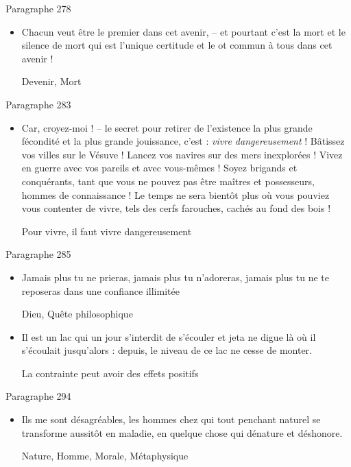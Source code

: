 \documentclass[french,a4paper,11pt,answers]{exam}
\newcommand{\cit}[2]{\og #1 \fg{} \begin{solution}{ #2 }\end{solution}} %
\begin{document}
	\begin{cadre}{Paragraphe 278}
		\begin{itemize}
			\item \cit{Chacun veut être le premier dans cet avenir, -- et pourtant c'est la mort et le silence de mort qui est l'unique certitude et le ot commun à tous dans cet avenir !}
				{Devenir, Mort}
		\end{itemize}
	\end{cadre}
	
	\begin{cadre}{Paragraphe 283}
		\begin{itemize}
			\item \cit{Car, croyez-moi ! -- le secret pour retirer de l'existence la plus grande fécondité et la plus grande jouissance, c'est : \emph{vivre dangereusement} ! Bâtissez vos villes sur le Vésuve ! Lancez vos navires sur des mers inexplorées ! Vivez en guerre avec vos pareils et avec vous-mêmes ! Soyez brigands et conquérants, tant que vous ne pouvez pas être maîtres et possesseurs, hommes de connaissance ! Le temps ne sera bientôt plus où vous pouviez vous contenter de vivre, tels des cerfs farouches, cachés au fond des bois !}
				{Pour vivre, il faut vivre dangereusement}
		\end{itemize}
	\end{cadre}
	
	\begin{cadre}{Paragraphe 285}
		\begin{itemize}
			\item \cit{Jamais plus tu ne prieras, jamais plus tu n'adoreras, jamais plus tu ne te reposeras dans une confiance illimitée}
				{Dieu, Quête philosophique}
			\item \cit{Il est un lac qui un jour s'interdit de s'écouler et jeta ne digue là où il s'écoulait jusqu'alors : depuis, le niveau de ce lac ne cesse de monter.}
				{La contrainte peut avoir des effets positifs}
		\end{itemize}
	\end{cadre}
	
	\begin{cadre}{Paragraphe 294}
		\begin{itemize}
			\item \cit{Ils me sont désagréables, les hommes chez qui tout penchant naturel se transforme aussitôt en maladie, en quelque chose qui dénature et déshonore.}
				{Nature, Homme, Morale, Métaphysique}
		\end{itemize}
	\end{cadre}
\end{document}
